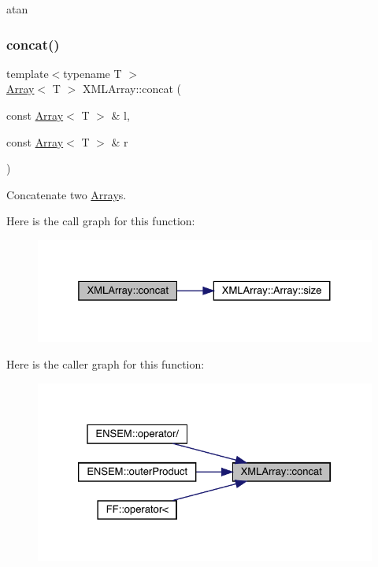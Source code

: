 atan 

\mbox{\label{namespaceXMLArray_af16029dd462356447ca4c8264203335a}} 
\subsubsection{\texorpdfstring{concat()}{concat()}}
{\footnotesize\ttfamily template$<$typename T $>$ \\
\mbox{\hyperlink{classXMLArray_1_1Array}{Array}}$<$ T $>$ X\+M\+L\+Array\+::concat (\begin{DoxyParamCaption}\item[{const \mbox{\hyperlink{classXMLArray_1_1Array}{Array}}$<$ T $>$ \&}]{l,  }\item[{const \mbox{\hyperlink{classXMLArray_1_1Array}{Array}}$<$ T $>$ \&}]{r }\end{DoxyParamCaption})\hspace{0.3cm}{\ttfamily [inline]}}



Concatenate two \mbox{\hyperlink{classXMLArray_1_1Array}{Array}}\textquotesingle{}s. 

Here is the call graph for this function\+:\nopagebreak
\begin{figure}[H]
\begin{center}
\leavevmode
\includegraphics[width=325pt]{dd/db1/namespaceXMLArray_af16029dd462356447ca4c8264203335a_cgraph}
\end{center}
\end{figure}
Here is the caller graph for this function\+:\nopagebreak
\begin{figure}[H]
\begin{center}
\leavevmode
\includegraphics[width=326pt]{dd/db1/namespaceXMLArray_af16029dd462356447ca4c8264203335a_icgraph}
\end{center}
\end{figure}
\mbox{\label{namespaceXMLArray_afae227c9b7f0e447f5e058acd82cc580}} 
